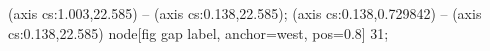  (axis cs:1.003,22.585) -- (axis cs:0.138,22.585);
 (axis cs:0.138,0.729842) -- (axis cs:0.138,22.585)
  node[fig gap label, anchor=west, pos=0.8] {\texttimes{}31};
